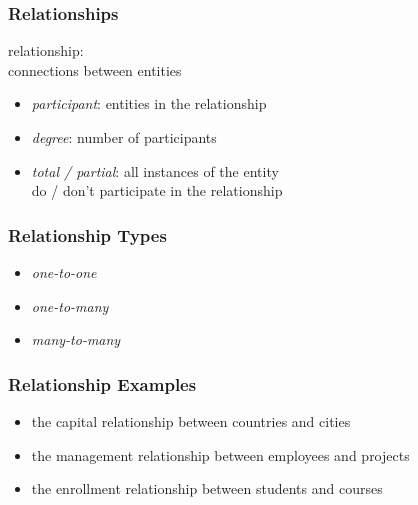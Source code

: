 \documentclass[dvipsnames]{beamer}
\begin{document}
\begin{frame}
  \frametitle{Relationships}

  \begin{definition}
    \alert{relationship}:\\
      connections between entities

    \pause
    \begin{itemize}
      \item \emph{participant}: entities in the relationship
      \item \emph{degree}: number of participants
      \item \emph{total / partial}: all instances of the entity\\
        do / don't participate in the relationship
    \end{itemize}
  \end{definition}
\end{frame}

\begin{frame}
  \frametitle{Relationship Types}

  \begin{itemize}
    \item \emph{one-to-one}
    \item \emph{one-to-many}
    \item \emph{many-to-many}
  \end{itemize}
\end{frame}

\begin{frame}
  \frametitle{Relationship Examples}

  \begin{example}
    \begin{itemize}
      \item the capital relationship between countries and cities
    \end{itemize}
  \end{example}

  \pause
  \begin{example}
    \begin{itemize}
      \item the management relationship between employees and projects
    \end{itemize}
  \end{example}

  \pause
  \begin{example}
    \begin{itemize}
      \item the enrollment relationship between students and courses
    \end{itemize}
  \end{example}
\end{frame}
\end{document}
